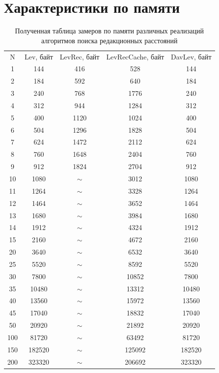 \section{Характеристики по памяти}
\begin{table}[!ht]
	\centering
	\caption{Полученная таблица замеров по памяти различных реализаций алгоритмов поиска редакционных расстояний}
	\begin{tabular}{|c|c|c|c|c|}
		\hline
		N  & Lev, байт & LevRec, байт & LevRecCache, байт & DavLev, байт \\
		1 & 144 & 416 & 528 & 144 \\ \hline
		2 & 184 & 592 & 640 & 184 \\ \hline
		3 & 240 & 768 & 1776 & 240 \\ \hline
		4 & 312 & 944 & 1284 & 312 \\ \hline
		5 & 400 & 1120 & 1024 & 400 \\ \hline
		6 & 504 & 1296 & 1828 & 504 \\ \hline
		7 & 624 & 1472 & 2112 & 624 \\ \hline
		8 & 760 & 1648 & 2404 & 760 \\ \hline
		9 & 912 & 1824 & 2704 & 912 \\ \hline
		10 & 1080 & $\sim$ & 3012 & 1080 \\ \hline
		11 & 1264 & $\sim$ & 3328 & 1264 \\ \hline
		12 & 1464 & $\sim$ & 3652 & 1464 \\ \hline
		13 & 1680 & $\sim$ & 3984 & 1680 \\ \hline
		14 & 1912 & $\sim$ & 4324 & 1912 \\ \hline
		15 & 2160 & $\sim$ & 4672 & 2160 \\ \hline
		20 & 3640 & $\sim$ & 6532 & 3640 \\ \hline
		25 & 5520 & $\sim$ & 8592 & 5520 \\ \hline
		30 & 7800 & $\sim$ & 10852 & 7800 \\ \hline
		35 & 10480 & $\sim$ & 13312 & 10480 \\ \hline
		40 & 13560 & $\sim$ & 15972 & 13560 \\ \hline
		45 & 17040 & $\sim$ & 18832 & 17040 \\ \hline
		50 & 20920 & $\sim$ & 21892 & 20920 \\ \hline
		100 & 81720 & $\sim$ & 63492 & 81720 \\ \hline
		150 & 182520 & $\sim$ & 125092 & 182520 \\ \hline
		200 & 323320 & $\sim$ & 206692 & 323320 \\ \hline
	\end{tabular}
	\label{t:memory}
\end{table}

